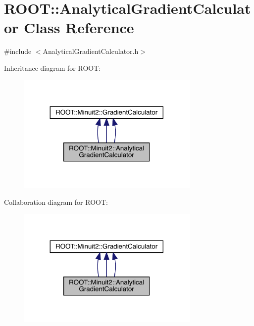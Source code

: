 \hypertarget{classROOT_1_1Minuit2_1_1AnalyticalGradientCalculator}{}\section{R\+O\+OT\+:\+:Analytical\+Gradient\+Calculator Class Reference}
\label{classROOT_1_1Minuit2_1_1AnalyticalGradientCalculator}


{\ttfamily \#include $<$Analytical\+Gradient\+Calculator.\+h$>$}



Inheritance diagram for R\+O\+OT\+:
\nopagebreak
\begin{figure}[H]
\begin{center}
\leavevmode
\includegraphics[width=251pt]{d3/de4/classROOT_1_1Minuit2_1_1AnalyticalGradientCalculator__inherit__graph}
\end{center}
\end{figure}


Collaboration diagram for R\+O\+OT\+:
\nopagebreak
\begin{figure}[H]
\begin{center}
\leavevmode
\includegraphics[width=251pt]{dd/dfa/classROOT_1_1Minuit2_1_1AnalyticalGradientCalculator__coll__graph}
\end{center}
\end{figure}

